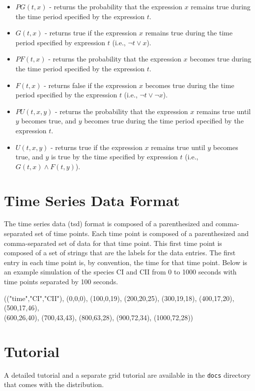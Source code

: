 \documentclass[titlepage,11pt]{article}
\begin{document}
\begin{itemize}
\item $PG(t,x)$ - returns the probability that the expression $x$ remains true during the time period specified by the expression $t$.
\item $G(t,x)$ - returns true if the expression $x$ remains true during the time period specified by expression $t$ (i.e., $\neg t \vee x$). 
\item $PF(t,x)$ - returns the probability that the expression $x$ becomes true during the time period specified by the expression $t$.
\item $F(t,x)$ - returns false if the expression $x$ becomes true during the time period specified by the expression $t$ (i.e., $\neg t \vee \neg x$). 
\item $PU(t,x,y)$ - returns the probability that the expression $x$ remains true until $y$ becomes true, and $y$ becomes true during the time period specified by the expression $t$.
\item $U(t,x,y)$ - returns true if the expression $x$ remains true until $y$ becomes true, and $y$ is true by the time specified by expression $t$ (i.e., $G(t,x) \wedge F(t,y)$). 
\end{itemize}

\section{\label{TSD}Time Series Data Format}

\noindent
The time series data (tsd) format is composed of a parenthesized and comma-separated set of time points. Each time point is composed of a parenthesized and comma-separated set of data for that time point. This first time point is composed of a set of strings that are the labels for the data entries. The first entry in each time point is, by convention, the time for that time point. Below is an example simulation of the species CI and CII from 0 to 1000 seconds with time points separated by 100 seconds. 

(("time","CI","CII"), (0,0,0), (100,0,19), (200,20,25), (300,19,18), (400,17,20), (500,17,46), \\
(600,26,40), (700,43,43), (800,63,28), (900,72,34), (1000,72,28))

\section{Tutorial}

\noindent
A detailed 
tutorial
and a separate
grid tutorial
are available in the {\tt docs} directory that comes with the distribution.
\end{document}
